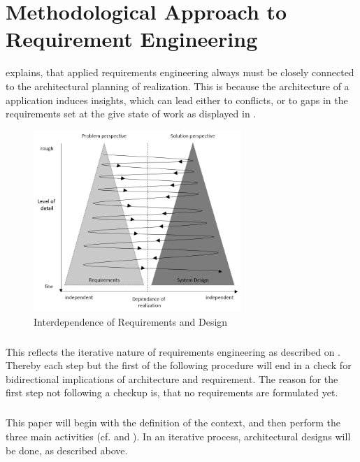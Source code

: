 \chapter{Methodological Approach to Requirement Engineering}
\textcite[22-23]{Pohl.2007} explains, that applied requirements engineering always must be closely connected to the architectural planning of realization. This is because the architecture of a application induces insights, which can lead either to conflicts, or to gaps in the requirements set at the give state of work \parencites[22-23]{Pohl.2007} as displayed in . 

\begin{figure}[H]
    \centering
    \includegraphics[width=0.7\textwidth]{img/iterative.png}
    \caption[Interdependence of Requirements and Design]{Interdependence of Requirements and Design \parencite[23]{Pohl.2007}}
    \label{fig:iterative}
\end{figure}

\paragraph{} This reflects the iterative nature of requirements engineering as described on . Thereby each step but the first of the following procedure will end in a check for bidirectional implications of architecture and requirement. The reason for the first step not following a checkup is, that no requirements are formulated yet. 


\paragraph{} This paper will begin with the definition of the context, and then perform the three main activities (cf.  and ). In an iterative process, architectural designs will be done, as described above. 



